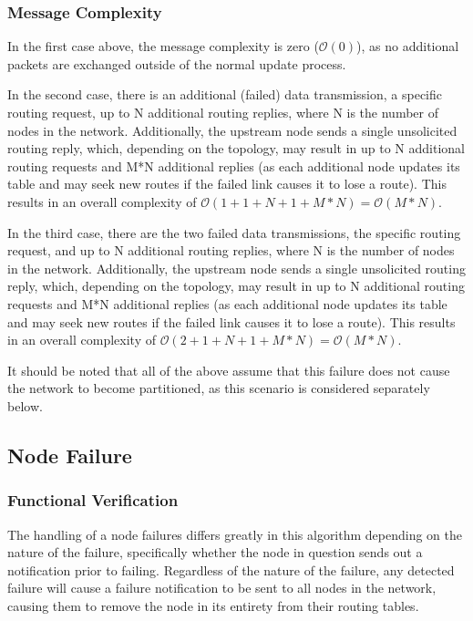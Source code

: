 \subsubsection{Message Complexity}
In the first case above, the message complexity is zero ($\mathcal{O}(0)$), as no additional packets are exchanged outside of the normal update process. 

In the second case, there is an additional (failed) data transmission, a specific routing request, up to N additional routing replies, where N is the number of nodes in the network. Additionally, the upstream node sends a single unsolicited routing reply, which, depending on the topology, may result in up to N additional routing requests and M*N additional replies (as each additional node updates its table and may seek new routes if the failed link causes it to lose a route). This results in an overall complexity of $\mathcal{O}(1 + 1 + N + 1 +M*N) = \mathcal{O}(M*N)$.

In the third case, there are the two failed data transmissions, the specific routing request, and up to N additional routing replies, where N is the number of nodes in the network. Additionally, the upstream node sends a single unsolicited routing reply, which, depending on the topology, may result in up to N additional routing requests and M*N additional replies (as each additional node updates its table and may seek new routes if the failed link causes it to lose a route). This results in an overall complexity of $\mathcal{O}(2 + 1 + N + 1 +M*N) = \mathcal{O}(M*N)$.

It should be noted that all of the above assume that this failure does not cause the network to become partitioned, as this scenario is considered separately below.

\subsection{Node Failure}\label{subsec:IPNodeFailure}
\subsubsection{Functional Verification}
The handling of a node failures differs greatly in this algorithm depending on the nature of the failure, specifically whether the node in question sends out a notification prior to failing. Regardless of the nature of the failure, any detected failure will cause a failure notification to be sent to all nodes in the network, causing them to remove the node in its entirety from their routing tables.

